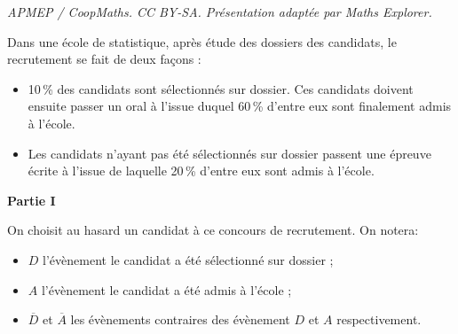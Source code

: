 \documentclass[10pt]{article}
\begin{document}
\noindent\textit{APMEP / CoopMaths. CC BY-SA. Présentation adaptée par Maths Explorer.}\par\medskip
\medskip

Dans une école de statistique, après étude des dossiers des candidats, le recrutement se fait de deux façons :

\setlength\parindent{1cm}
\begin{itemize}
\item[$\bullet~~$] 10\,\% des candidats sont sélectionnés sur dossier. Ces candidats doivent ensuite passer un oral à l'issue duquel 60\,\% d'entre eux sont finalement admis à l'école.
\item[$\bullet~~$] Les candidats n'ayant pas été sélectionnés sur dossier passent une épreuve écrite à l'issue de laquelle 20\,\% d'entre eux sont admis à l'école.
\end{itemize}
\setlength\parindent{0cm}



\begin{center}
\textbf{Partie I}
\end{center}

On choisit au hasard un candidat à ce concours de recrutement. On notera:

\setlength\parindent{1cm}
\begin{itemize}
\item[$\bullet~~$] $D$ l'évènement \og le candidat a été sélectionné sur dossier \fg{} ;
\item[$\bullet~~$] $A$ l'évènement \og le candidat a été admis à l'école \fg{} ;
\item[$\bullet~~$] $\overline{D}$ et $\overline{A}$ les évènements contraires des évènement $D$ et $A$ respectivement.
\end{itemize}
\setlength\parindent{0cm}

\medskip
\end{document}
